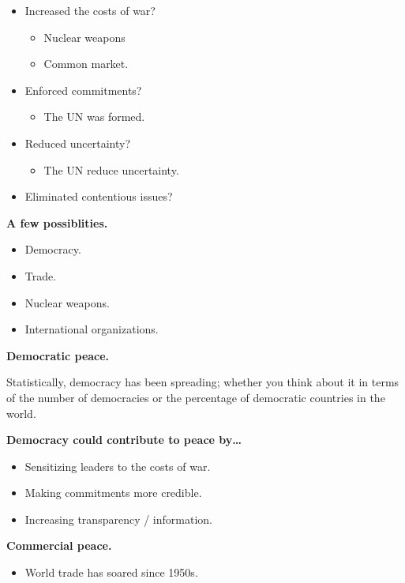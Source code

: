 \documentclass{article}
\begin{document}
\begin{itemize}
  \item Increased the costs of war?
    \begin{itemize}
      \item Nuclear weapons
      \item Common market.
    \end{itemize}
  \item Enforced commitments?
    \begin{itemize}
      \item The UN was formed.
    \end{itemize}
  \item Reduced uncertainty?
    \begin{itemize}
      \item The UN reduce uncertainty.
    \end{itemize}
  \item Eliminated contentious issues?
\end{itemize}

{\bf A few possiblities.}

\begin{itemize}
  \item Democracy.
  \item Trade.
  \item Nuclear weapons.
  \item International organizations.
\end{itemize}

{\bf Democratic peace.}

Statistically, democracy has been spreading; whether you think about it in terms of the number of democracies or the percentage of democratic countries in the world.

{\bf Democracy could contribute to peace by\ldots}

\begin{itemize}
  \item Sensitizing leaders to the costs of war.
  \item Making commitments more credible.
  \item Increasing transparency / information.
\end{itemize}

{\bf Commercial peace.}

\begin{itemize}
  \item World trade has soared since 1950s.
\end{itemize}
\end{document}
